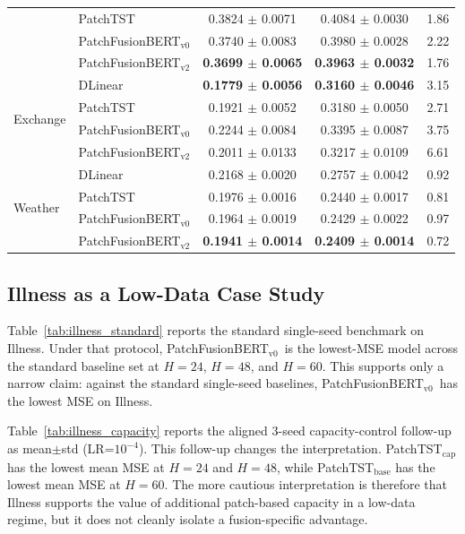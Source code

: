 \documentclass{ieeeaccess}
\newcommand{\modelvzero}{PatchFusionBERT$_{\text{v0}}$\xspace}
\newcommand{\modelvtwo}{PatchFusionBERT$_{\text{v2}}$\xspace}
\begin{document}
\begin{table}[t]
{\begin{tabular}{@{}llccc@{}}
& PatchTST   & 0.3824 $\pm$ 0.0071 & 0.4084 $\pm$ 0.0030 & 1.86 \\
& \modelvzero & 0.3740 $\pm$ 0.0083 & 0.3980 $\pm$ 0.0028 & 2.22 \\
& \modelvtwo  & \textbf{0.3699 $\pm$ 0.0065} & \textbf{0.3963 $\pm$ 0.0032} & 1.76 \\
\midrule
\multirow{4}{*}{Exchange}
& DLinear    & \textbf{0.1779 $\pm$ 0.0056} & \textbf{0.3160 $\pm$ 0.0046} & 3.15 \\
& PatchTST   & 0.1921 $\pm$ 0.0052 & 0.3180 $\pm$ 0.0050 & 2.71 \\
& \modelvzero & 0.2244 $\pm$ 0.0084 & 0.3395 $\pm$ 0.0087 & 3.75 \\
& \modelvtwo  & 0.2011 $\pm$ 0.0133 & 0.3217 $\pm$ 0.0109 & 6.61 \\
\midrule
\multirow{4}{*}{Weather}
& DLinear    & 0.2168 $\pm$ 0.0020 & 0.2757 $\pm$ 0.0042 & 0.92 \\
& PatchTST   & 0.1976 $\pm$ 0.0016 & 0.2440 $\pm$ 0.0017 & 0.81 \\
& \modelvzero & 0.1964 $\pm$ 0.0019 & 0.2429 $\pm$ 0.0022 & 0.97 \\
& \modelvtwo  & \textbf{0.1941 $\pm$ 0.0014} & \textbf{0.2409 $\pm$ 0.0014} & 0.72 \\
\bottomrule
\end{tabular}
}
\end{table}

\subsection{Illness as a Low-Data Case Study}
\label{sec:illness}
Table~\ref{tab:illness_standard} reports the standard single-seed benchmark on
Illness. Under that protocol, \modelvzero\ is the lowest-MSE model across the standard
baseline set at $H=24$, $H=48$, and $H=60$. This supports only a narrow claim: against the
standard single-seed baselines, \modelvzero\ has the lowest MSE on Illness.

Table~\ref{tab:illness_capacity} reports the aligned 3-seed capacity-control
follow-up as mean$\pm$std (LR=$10^{-4}$). This follow-up changes the interpretation.
PatchTST$_\text{cap}$ has the lowest mean MSE at $H=24$ and $H=48$, while
PatchTST$_\text{base}$ has the lowest mean MSE at $H=60$. The more cautious interpretation is therefore
that Illness supports the value of additional patch-based capacity in a low-data
regime, but it does not cleanly isolate a fusion-specific advantage.
\end{document}
